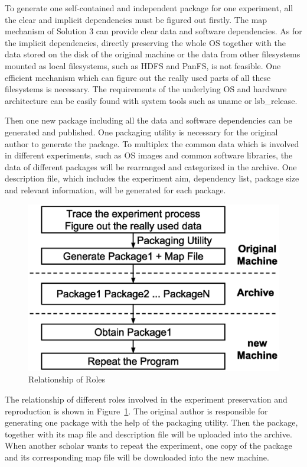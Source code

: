 \documentclass{sig-alternate}
\begin{document}
To generate one self-contained and independent package for one experiment, all
the clear and implicit dependencies must be figured out firstly. The map mechanism
of Solution 3 can provide clear data and software dependencies. As for the
implicit dependencies, directly preserving the whole OS together with the data
stored on the disk of the original machine or the data from other filesystems
mounted as local filesystems, such as HDFS and PanFS, is not feasible. One
efficient mechanism which can figure out the really used parts of all these
filesystems is necessary. The requirements of the underlying OS and hardware
architecture can be easily found with system tools such as uname or
lsb\_release.

Then one new package including all the data and software dependencies can be generated and published. 
One packaging utility is necessary for the original author to generate the package. 
To multiplex the common data which is involved in different experiments, such as OS images and common software libraries, the data of different packages will be rearranged and categorized in the archive.
One description file, which includes the experiment aim, dependency list,  package size and relevant information, will be generated for each package.

\begin{figure}
\centering
\includegraphics[width=.8\columnwidth]{solution3.eps}
\caption{Relationship of Roles}
\label{fig:solution3}
\end{figure}

The relationship of different roles involved in the experiment preservation and
reproduction is shown in Figure~\ref{fig:solution3}.  The original author is
responsible for generating one package with the help of the packaging utility. Then the package, together with
its map file and description file will be uploaded into the archive. When
another scholar wants to repeat the experiment, one copy of the package and its
corresponding map file will be downloaded into the new machine.
\end{document}

